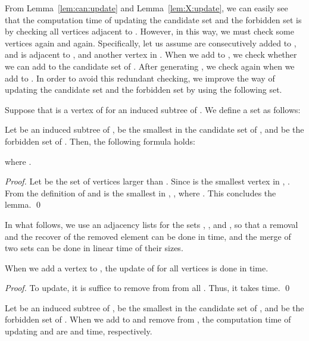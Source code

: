 \documentclass{llncs}
\begin{document}
From Lemma~\ref{lem:can:update} and Lemma~\ref{lem:X:update}, 
we can easily see that 
the computation time of updating 
the candidate set and the forbidden set 
is  by checking all vertices adjacent to . 
However, in this way, 
we must check some vertices again and again. 
Specifically, 
let us assume  are consecutively added to , 
and  is adjacent to ,  and another vertex in . 
When we add  to , 
we check whether we can add  to the candidate set of . 
After generating , we check  again 
when we add  to . 
In order to avoid this redundant checking, 
we improve the way of updating the candidate set and the forbidden set 
by using the following set. 


\begin{definition}
    Suppose that  is a vertex of  for an induced subtree of . 
    We define a set  
    as follows: 
    
\end{definition}

\begin{lemma}
    \label{lem:mod:update:Can}
    Let  be an induced subtree of , 
     be the smallest in the candidate set  of , 
    and  be the forbidden set of . 
    Then, the following formula holds: 
    
    where .  
\end{lemma}

\begin{proof}
    Let  be the set of vertices larger than . 
    Since  is the smallest vertex in , 
    . 
    From the definition of  
    and  is the smallest in 
    , 
    , 
    where . 
This concludes the lemma.
    \qed
\end{proof}


In what follows, 
we use an 
adjacency lists for the sets , , and , 
so that a removal and the recover of the removed element 
can be done in  time, 
and the merge of two sets can be done in linear time of their sizes.


\begin{lemma}
    \label{lem:mod:update:X:neighbor}
    When we add a vertex  to , 
    the update of   for all vertices  is done in  time.
\end{lemma}

\begin{proof}
    To update, 
    it is suffice to remove  from  from all . 
    Thus, it takes  time.
    \qed
\end{proof}

\begin{lemma}
    \label{lem:mod:update:Can:X}
    Let  be an induced subtree of , 
     be the smallest in the candidate set  of , 
    and  be the forbidden set of .  
    When we add  to  and remove  from , 
    the computation time of updating  and  are
     and  time, respectively.  
\end{lemma}
\end{document}

